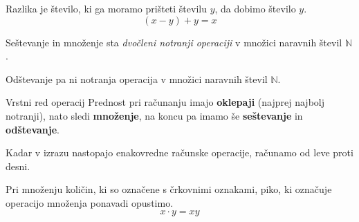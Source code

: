 \begin{frame}
\begin{block}{}
\begin{figure}
                        
            \end{figure}
        \end{block}

            \begin{block}{}
                Razlika je število, ki ga moramo prišteti številu $y$, da dobimo število $y$.
                $$ (x-y)+y=x $$
            \end{block}

        \end{frame}

        \begin{frame}
            \begin{block}{}
                Seštevanje in množenje sta \textit{dvočleni notranji operaciji} v množici naravnih števil $\mathbb{N}$.

                Odštevanje pa ni notranja operacija v množici naravnih števil $\mathbb{N}$.
            \end{block}

            \begin{block}{Vrstni red operacij}
                Prednost pri računanju imajo \textbf{oklepaji} (najprej najbolj notranji), nato sledi \textbf{množenje},
                na koncu pa imamo še \textbf{seštevanje} in \textbf{odštevanje}.
            \end{block}

            \begin{block}{}
                Kadar v izrazu nastopajo enakovredne računske operacije, računamo od leve proti desni.
            \end{block}

            \begin{block}{}
                Pri množenju količin, ki so označene s črkovnimi oznakami, piko, ki označuje operacijo množenja ponavadi opustimo.
                $$ x\cdot y = xy$$
            \end{block}


        \end{frame}

